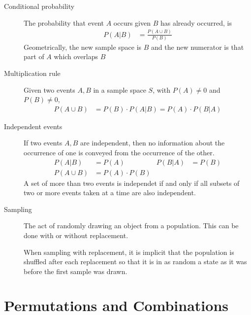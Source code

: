 \begin{description}
    \item[Conditional probability] The probability that event $ A $ occurs given
          $ B $ has already occurred, is
          \begin{align}
              P(A|B) & = \frac{P(A \cup B)}{P(B)}
          \end{align}
          Geometrically, the new sample space is $ B $ and the new numerator is that
          part of $ A $ which overlaps $ B $

    \item[Multiplication rule] Given two events $ A,B $ in a sample space $ S $,
          with $ P(A) \neq 0 $ and $ P(B) \neq 0 $,
          \begin{align}
              P(A \cup B) & = P(B) \cdot P(A|B) = P(A) \cdot P(B|A)
          \end{align}

    \item[Independent events] If two events $ A,B $ are independent, then no
          information about the occurrence of one is conveyed from the occurrence of the
          other.
          \begin{align}
              P(A|B)      & = P(A)            & P(B|A) & = P(B) \\
              P(A \cup B) & = P(A) \cdot P(B)
          \end{align}
          A set of more than two events is independet if and only if all subsets of
          two or more events taken at a time are also independent.

    \item[Sampling] The act of randomly drawing an object from a population. This can be
          done with or without replacement. \par
          When sampling with replacement, it is implicit that the population is shuffled
          after each replacement so that it is in as random a state as it was before the
          first sample was drawn.

\end{description}

\section{Permutations and Combinations}

